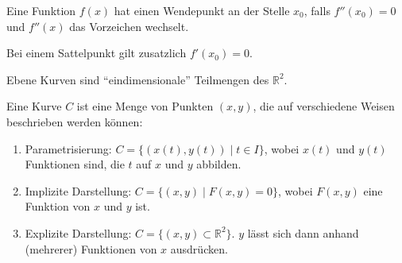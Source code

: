 \documentclass[12pt]{article}
\newcommand{\R}{\mathbb{R}} %
\newenvironment{definition}[2][Definition]{\begin{trivlist}
        \item[\hskip \labelsep {\bfseries #1}\hskip \labelsep {\bfseries #2.}]}{\flushright{$\square$}\end{trivlist}}
\newenvironment{remark}[2][Bemerkung]{\begin{trivlist}
        \item[\hskip \labelsep {\bfseries #1}\hskip \labelsep {\bfseries #2.}]}{\end{trivlist}}
\begin{document}
\begin{definition}{[Wendepunkte]}
        Eine Funktion $f(x)$ hat einen Wendepunkt an der Stelle $x_0$, falls $f''(x_0)=0$ und $f''(x)$ das Vorzeichen wechselt.

        \begin{remark}{[Wendepunkte und Sattelpunkte]}
                Bei einem Sattelpunkt gilt zusatzlich $f'(x_0)=0$.
        \end{remark}
\end{definition}

\begin{definition}{[Ebene Kurven]}
        Ebene Kurven sind ``eindimensionale'' Teilmengen des $\R^2$.

        Eine Kurve $C$ ist eine Menge von Punkten $(x,y)$, die auf verschiedene Weisen
        beschrieben werden können:
        \begin{enumerate}
                \item Parametrisierung: $C=\{(x(t),y(t))\mid t\in I\}$, wobei $x(t)$ und $y(t)$
                      Funktionen sind, die $t$ auf $x$ und $y$ abbilden.
                \item Implizite Darstellung: $C=\{(x,y)\mid F(x,y)=0\}$, wobei $F(x,y)$ eine Funktion
                      von $x$ und $y$ ist.
                \item Explizite Darstellung: $C=\{(x,y)\subset\R^2\}$. $y$ lässt sich dann anhand (mehrerer) Funktionen von $x$ ausdrücken.
                

\end{enumerate}
\end{definition}
\end{document}
